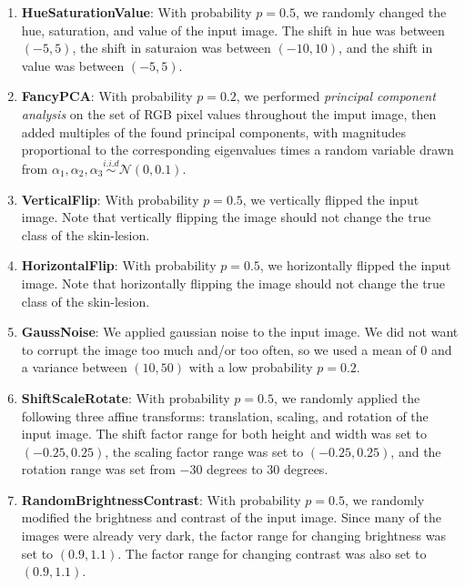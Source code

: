 \documentclass [MAS] {uclathes}
\begin{document}
\begin{enumerate}
    \item \textbf{HueSaturationValue}: With probability $p=0.5$, we randomly changed the hue, saturation, and value of the input image. The shift in hue was between $(-5, 5)$, the shift in saturaion was between $(-10, 10)$, and the shift in value was between $(-5, 5)$.
    \item \textbf{FancyPCA}: With probability $p=0.2$, we performed \textit{principal component analysis} on the set of RGB pixel values throughout the imput image, then added multiples of the found principal components, with magnitudes proportional to the corresponding eigenvalues times a random variable drawn from $\alpha_1, \alpha_2, \alpha_3 \stackrel{i.i.d}{\sim} \mathcal{N}(0, 0.1)$.
    \item \textbf{VerticalFlip}: With probability $p=0.5$, we vertically flipped the input image. Note that vertically flipping the image should not change the true class of the skin-lesion.
    \item \textbf{HorizontalFlip}: With probability $p=0.5$, we horizontally flipped the input image. Note that horizontally flipping the image should not change the true class of the skin-lesion.
    \item \textbf{GaussNoise}: We applied gaussian noise to the input image. We did not want to corrupt the image too much and/or too often, so we used a mean of $0$ and a variance between $(10, 50)$ with a low probability $p=0.2$.
    \item \textbf{ShiftScaleRotate}: With probability $p=0.5$, we randomly applied the following three affine transforms: translation, scaling, and rotation of the input image. The shift factor range for both height and width was set to $(-0.25, 0.25)$, the scaling factor range was set to $(-0.25, 0.25)$, and the rotation range was set from $-30$ degrees to $30$ degrees. 
    \item \textbf{RandomBrightnessContrast}: With probability $p=0.5$, we randomly modified the brightness and contrast of the input image. Since many of the images were already very dark, the factor range for changing brightness was set to $(0.9, 1.1)$. The factor range for changing contrast was also set to $(0.9, 1.1)$.
\end{enumerate}
\end{document}
